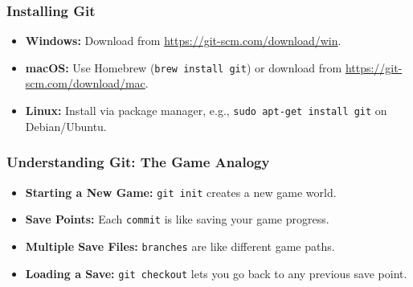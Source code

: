 \documentclass[10pt]{beamer}
\begin{document}
\begin{frame}
    \frametitle{Installing Git}
    \begin{itemize}
        \item \textbf{Windows:} Download from \url{https://git-scm.com/download/win}.
        \item \textbf{macOS:} Use Homebrew (\texttt{brew install git}) or download from \url{https://git-scm.com/download/mac}.
        \item \textbf{Linux:} Install via package manager, e.g., \texttt{sudo apt-get install git} on Debian/Ubuntu.
    \end{itemize}
\end{frame}

\begin{frame}
    \frametitle{Understanding Git: The Game Analogy}
    \begin{itemize}
        \item \textbf{Starting a New Game:} \texttt{git init} creates a new game world.
        \item \textbf{Save Points:} Each \texttt{commit} is like saving your game progress.
        \item \textbf{Multiple Save Files:} \texttt{branches} are like different game paths.
        \item \textbf{Loading a Save:} \texttt{git checkout} lets you go back to any previous save point.
    \end{itemize}

    \vspace{0.5em}
    \centering
\end{frame}
\end{document}
